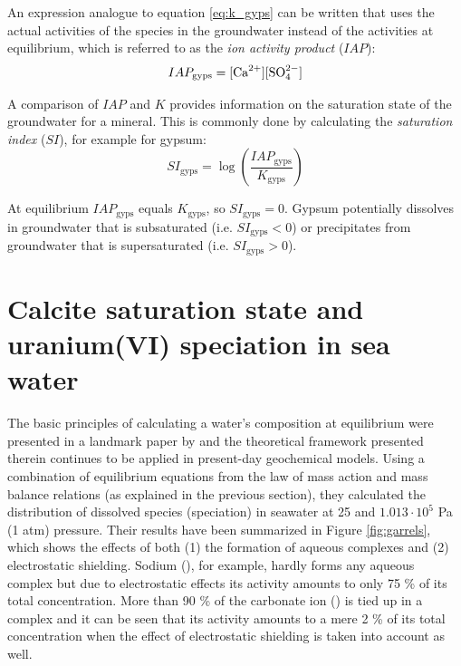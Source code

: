 An expression analogue to equation \ref{eq:k_gyps} can be written that uses the actual activities of the species in the groundwater instead of the activities at equilibrium, which is referred to as the \textit{ion activity product} ($IAP$):
\begin{equation}
IAP_\text{gyps} = [\text{Ca}^{2+}][\text{SO}^{2-}_4]
\end{equation}

A comparison of $IAP$ and $K$ provides information on the saturation state of the groundwater for a mineral. This is commonly done by calculating the \textit{saturation index} ($SI$), for example for gypsum:
\begin{equation}
SI_\text{gyps} = \log \left(\frac{IAP_\text{gyps}}{K_\text{gyps}} \right)
\label{eq:si_gyps}
\end{equation}

At equilibrium $IAP_\text{gyps}$ equals $K_\text{gyps}$, so $SI_\text{gyps} = 0$. Gypsum potentially dissolves in groundwater that is subsaturated (i.e. $SI_\text{gyps} < 0$) or precipitates from groundwater that is supersaturated (i.e. $SI_\text{gyps} > 0$).





\section{Calcite saturation state and uranium(VI) speciation in sea water}
The basic principles of calculating a water's composition at equilibrium were presented in a landmark paper by \citet{garrels_thompson1963} and the theoretical framework presented therein continues to be applied in present-day geochemical models. Using a combination of equilibrium equations from the law of mass action and mass balance relations (as explained in the previous section), they calculated the distribution of dissolved species (speciation) in seawater at \unit{25}{\celsius} and $1.013 \cdot 10^5$ Pa (1 atm) pressure. Their results have been summarized in Figure \ref{fig:garrels}, which shows the effects of both (1) the formation of aqueous complexes and (2) electrostatic shielding. Sodium (\na), for example, hardly forms any aqueous complex but due to electrostatic effects its activity amounts to only 75 \% of its total concentration. More than 90 \% of the carbonate ion (\cb) is tied up in a complex and it can be seen that its activity amounts to a mere 2 \% of its total concentration when the effect of electrostatic shielding is taken into account as well.

